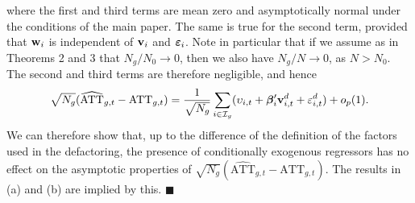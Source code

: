 \documentclass[12pt,fleqn]{article}
\begin{document}
where the first and third terms are mean zero and asymptotically normal under the conditions of the main paper. The same is true for the second term, provided that $\mathbf{w}_{i}$ is independent of $\mathbf{v}_i$ and $\boldsymbol{\varepsilon}_{i}$. Note in particular that if we assume as in Theorems 2 and 3 that $N_g/N_0\to 0$, then we also have $N_g/N \to 0$, as $N > N_0$. The second and third terms are therefore negligible, and hence
\begin{align}
\sqrt{N_g}(\widehat{\mathrm{ATT}}_{g,t} - \mathrm{ATT}_{g,t}) = \frac{1}{\sqrt{N_g}}\sum_{i\in \mathcal{I}_g}(\upsilon_{i,t}  + \boldsymbol{\beta}_i'\mathbf{v}_{i,t}^d + \varepsilon_{i,t}^d)  + o_p(1).
\end{align}
We can therefore show that, up to the difference of the definition of the factors used in the defactoring, the presence of conditionally exogenous regressors has no effect on the asymptotic properties of $\sqrt{N_g}(\widehat{\mathrm{ATT}}_{g,t} - \mathrm{ATT}_{g,t})$. The results in (a) and (b) are implied by this. \hfill{$\blacksquare$}

\bigskip
\end{document}
